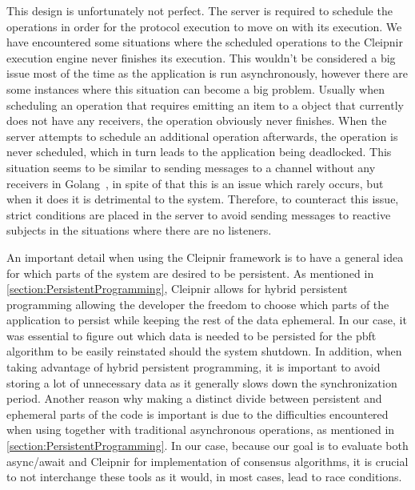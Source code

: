 This design is unfortunately not perfect. The server is required to schedule the operations in order for the protocol execution to move on with its execution. We have encountered some situations where the scheduled operations to the Cleipnir execution engine never finishes its execution. This wouldn’t be considered a big issue most of the time as the application is run asynchronously, however there are some instances where this situation can become a big problem. Usually when scheduling an operation that requires emitting an item to a  object that currently does not have any receivers, the operation obviously never finishes. When the server attempts to schedule an additional operation afterwards, the operation is never scheduled, which in turn leads to the application being deadlocked. This situation seems to be similar to sending messages to a channel without any receivers in Golang~\cite{WEB:golangChannels}, in spite of that this is an issue which rarely occurs, but when it does it is detrimental to the system. Therefore, to counteract this issue, strict conditions are placed in the server to avoid sending messages to reactive subjects in the situations where there are no listeners.
\fi

\label{sec:persvsephe}
An important detail when using the Cleipnir framework is to have a general idea for which parts of the system are desired to be persistent. As mentioned in \autoref{section:PersistentProgramming}, Cleipnir allows for hybrid persistent programming allowing the developer the freedom to choose which parts of the application to persist while keeping the rest of the data ephemeral. In our case, it was essential to figure out which data is needed to be persisted for the \ac{pbft} algorithm to be easily reinstated should the system shutdown. In addition, when taking advantage of hybrid persistent programming, it is important to avoid storing a lot of unnecessary data as it generally slows down the synchronization period. Another reason why making a distinct divide between persistent and ephemeral parts of the code is important is due to the difficulties encountered when using  together with traditional asynchronous operations, as mentioned in \autoref{section:PersistentProgramming}. In our case, because our goal is to evaluate both async/await and Cleipnir for implementation of consensus algorithms, it is crucial to not interchange these tools as it would, in most cases, lead to race conditions.

